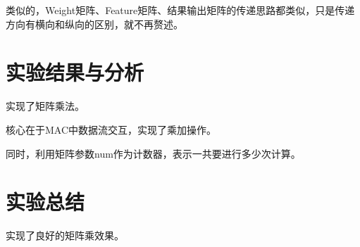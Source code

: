 \documentclass[12pt,a4paper]{article}
\begin{document}
类似的，Weight矩阵、Feature矩阵、结果输出矩阵的传递思路都类似，只是传递方向有横向和纵向的区别，就不再赘述。

\section{实验结果与分析}

实现了矩阵乘法。

核心在于MAC中数据流交互，实现了乘加操作。

同时，利用矩阵参数num作为计数器，表示一共要进行多少次计算。

\section{实验总结}

实现了良好的矩阵乘效果。
\end{document}
